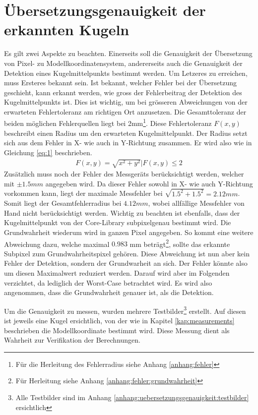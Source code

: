 \section{Übersetzungsgenauigkeit der erkannten Kugeln}\label{kap:uebersetzungsgenauigkeit}
Es gilt zwei Aspekte zu beachten. Einerseits soll die Genauigkeit der Übersetzung von Pixel- zu Modellkoordinatensystem,
andererseits auch die Genauigkeit der Detektion eines Kugelmittelpunkts bestimmt werden.
Um Letzeres zu erreichen, muss Ersteres bekannt sein. Ist bekannt, welcher Fehler bei der Übersetzung geschieht, kann
erkannt werden, wie gross der Fehlerbeitrag der Detektion des Kugelmittelpunkts ist. Dies ist wichtig, um bei
grösseren Abweichungen von der erwarteten Fehlertoleranz am richtigen Ort anzusetzen. Die Gesamttoleranz der beiden
möglichen Fehlerquellen liegt bei 2mm\footnote{Für die Herleitung des Fehlerradius siehe Anhang \ref{anhang:fehler}}. Diese Fehlertoleranz $F(x,y)$ beschreibt einen Radius um den erwarteten Kugelmittelpunkt.
Der Radius setzt sich aus dem Fehler in X- wie auch in Y-Richtung zusammen. Er wird also wie in Gleichung \ref{eq:1} beschrieben.
\begin{align}
    F(x,y) = \sqrt{x^2 + y^2} | F(x,y) \leq 2\label{eq:1}
\end{align}
Zusätzlich muss noch der Fehler des Messgeräts berücksichtigt werden, welcher mit $\pm 1.5mm$ angegeben wird. Da dieser
Fehler sowohl in X- wie auch Y-Richtung vorkommen kann, liegt der maximale Messfehler bei $\sqrt{1.5^2 + 1.5^2} = 2.12mm$. Somit liegt
der Gesamtfehlerradius bei $4.12mm$, wobei allfällige Messfehler von Hand nicht berücksichtigt werden. Wichtig zu beachten ist
ebenfalls, dass der Kugelmittelpunkt von der Core-Library subpixelgenau bestimmt wird. Die Grundwahrheit wiederum wird in
ganzen Pixel angegeben. So kommt eine weitere Abweichung dazu, welche maximal $0.983$ mm beträgt\footnote{Für Herleitung siehe Anhang \ref{anhang:fehler:grundwahrheit}},
sollte das erkannte Subpixel zum Grundwahrheitspixel gehören.
Diese Abweichung ist nun aber kein Fehler der Detektion, sondern der Grundwarheit an sich. Der Fehler könnte also um diesen
Maximalwert reduziert werden. Darauf wird aber im Folgenden verzichtet, da lediglich der Worst-Case betrachtet wird. Es wird
also angenommen, dass die Grundwahrheit genauer ist, als die Detektion.

Um die Genauigkeit zu messen, wurden mehrere Testbilder\footnote{Alle Testbilder sind im Anhang \ref{anhang:uebersetzungsgenauigkeit:testbilder} ersichtlich}
erstellt. Auf diesen ist jeweils eine Kugel ersichtlich, von der
wie in Kapitel \ref{kap:measurements} beschrieben die Modellkoordinate bestimmt wird. Diese Messung dient als Wahrheit zur
Verifikation der Berechnungen.


